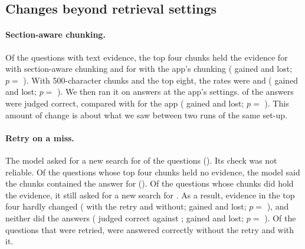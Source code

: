 \subsection{Changes beyond retrieval settings}
\label{sec:res-changes}

\paragraph{Section-aware chunking.} Of the \SectionsHitN{} questions with text evidence, the top
four chunks held the evidence for \SectionsHitAfter{} with section-aware chunking and for
\SectionsHitBefore{} with the app's chunking (\SectionsHitGained{} gained and \SectionsHitLost{}
lost; $p =$ \SectionsHitP{}). With 500-character chunks and the top eight, the rates were
\SectionsSmallHitAfter{} and \SectionsSmallHitBefore{} (\SectionsSmallHitGained{} gained and
\SectionsSmallHitLost{} lost; $p =$ \SectionsSmallHitP{}). We then ran it on answers at the app's
settings. \SectionsAnswersAfter{} of the answers were judged correct, compared with
\SectionsAnswersBefore{} for the app (\SectionsAnswersGained{} gained and \SectionsAnswersLost{}
lost; $p =$ \SectionsAnswersP{}). This amount of change is about what we saw between two runs of
the same set-up.

\paragraph{Retry on a miss.} The model asked for a new search for \RetryN{} of the
\RetryChecked{} questions (\RetryRate{}). Its check was not reliable. Of the \RetryMissed{}
questions whose top four chunks held no evidence, the model said the chunks contained the answer
for \RetryMissedKept{} (\RetryMissedKeptRate{}). Of the \RetryHeld{} questions whose chunks did
hold the evidence, it still asked for a new search for \RetryHeldRetried{}. As a result, evidence
in the top four hardly changed (\RetryHitAfter{} with the retry and \RetryHitBefore{} without;
\RetryHitGained{} gained and \RetryHitLost{} lost; $p =$ \RetryHitP{}), and neither did the
answers (\RetryAnswersAfter{} judged correct against \RetryAnswersBefore{}; \RetryAnswersGained{}
gained and \RetryAnswersLost{} lost; $p =$ \RetryAnswersP{}). Of the \RetryN{} questions that
were retried, \RetryRetriedBefore{} were answered correctly without the retry and
\RetryRetriedAfter{} with it.

